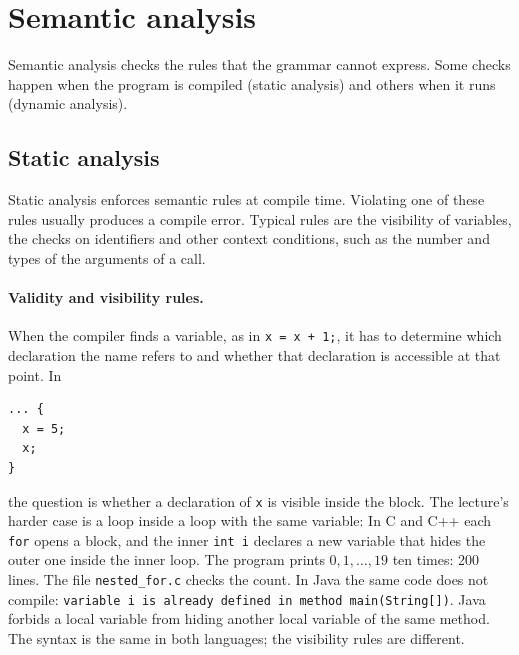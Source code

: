\section{Semantic analysis}
\label{sec:semantic}

Semantic analysis checks the rules that the grammar cannot express. Some
checks happen when the program is compiled (static analysis) and others when
it runs (dynamic analysis).

\subsection{Static analysis}

Static analysis enforces semantic rules at compile time. Violating one of
these rules usually produces a compile error. Typical rules are the
visibility of variables, the checks on identifiers and other context
conditions, such as the number and types of the arguments of a call.

\paragraph{Validity and visibility rules.} When the compiler finds a variable,
as in \texttt{x = x + 1;}, it has to determine which declaration the name
refers to and whether that declaration is accessible at that point. In
\begin{lstlisting}
... {
  x = 5;
  x;
}
\end{lstlisting}
the question is whether a declaration of \texttt{x} is visible inside the
block. The lecture's harder case is a loop inside a loop with the same
variable:
In C and C++ each \texttt{for} opens a block, and the inner \texttt{int i}
declares a new variable that hides the outer one inside the inner loop. The
program prints $0, 1, \dots, 19$ ten times: 200 lines. The file
\texttt{nested\_for.c} checks the count. In Java the same code does not compile:
\texttt{variable i is already defined in method main(String[])}. Java forbids
a local variable from hiding another local variable of the same method. The
syntax is the same in both languages; the visibility rules are different.

